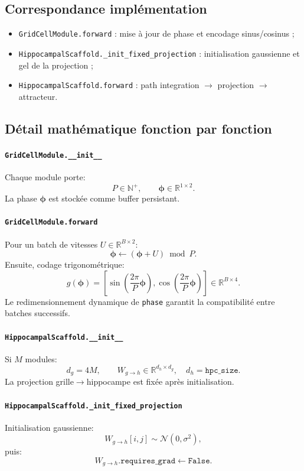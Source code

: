 \documentclass[12pt,a4paper]{article}
\begin{document}
\subsection{Correspondance implémentation}
\begin{itemize}
    \item \texttt{GridCellModule.forward} : mise à jour de phase et encodage sinus/cosinus ;
    \item \texttt{HippocampalScaffold.\_init\_fixed\_projection} : initialisation gaussienne et gel de la projection ;
    \item \texttt{HippocampalScaffold.forward} : path integration $\rightarrow$ projection $\rightarrow$ attracteur.
\end{itemize}

\subsection{Détail mathématique fonction par fonction}

\paragraph{\texttt{GridCellModule.\_\_init\_\_}}
Chaque module porte:
\[
P \in \mathbb{N}^+, \qquad \boldsymbol{\phi}\in\mathbb{R}^{1\times2}.
\]
La phase $\boldsymbol{\phi}$ est stockée comme buffer persistant.

\paragraph{\texttt{GridCellModule.forward}}
Pour un batch de vitesses $U\in\mathbb{R}^{B\times2}$:
\[
\boldsymbol{\phi}\leftarrow (\boldsymbol{\phi}+U)\bmod P.
\]
Ensuite, codage trigonométrique:
\[
g(\boldsymbol{\phi})=
\left[
\sin\!\left(\frac{2\pi}{P}\boldsymbol{\phi}\right),
\cos\!\left(\frac{2\pi}{P}\boldsymbol{\phi}\right)
\right]\in\mathbb{R}^{B\times4}.
\]
Le redimensionnement dynamique de \texttt{phase} garantit la compatibilité entre batches successifs.

\paragraph{\texttt{HippocampalScaffold.\_\_init\_\_}}
Si $M$ modules:
\[
d_g = 4M,\qquad W_{g\to h}\in\mathbb{R}^{d_h\times d_g},\quad d_h=\texttt{hpc\_size}.
\]
La projection grille$\rightarrow$hippocampe est fixée après initialisation.

\paragraph{\texttt{HippocampalScaffold.\_init\_fixed\_projection}}
Initialisation gaussienne:
\[
W_{g\to h}[i,j]\sim\mathcal{N}(0,\sigma^2),
\]
puis:
\[
W_{g\to h}.\texttt{requires\_grad}\leftarrow\texttt{False}.
\]
\end{document}
